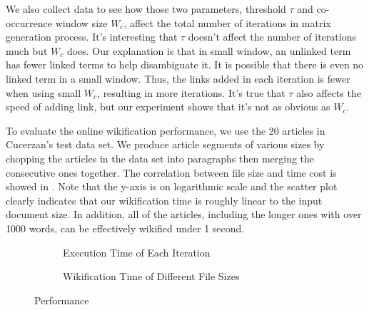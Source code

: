 We also collect data to see how those two parameters, threshold $\tau$ and co-occurrence
window size $W_c$, affect the total number of iterations in matrix generation process.
It's interesting that $\tau$ doesn't affect the number of iterations much but $W_c$ does.
Our explanation is that in small window, an unlinked term has fewer linked terms to
help disambiguate it. It is possible that there is even no linked term in a small window.
Thus, the links added in each iteration is fewer when using small $W_c$, resulting in
more iterations. It's true that $\tau$ also affects the speed of adding link, but our
experiment shows that it's not as obvious as $W_c$.


To evaluate the online wikification performance,
we use the 20 articles in Cucerzan's test data set.
We produce article segments of various sizes by chopping the articles in the
data set into paragraphs then merging the consecutive ones together.
The correlation between file size and time cost is showed in
. Note that the y-axis is on logarithmic scale and the
scatter plot clearly indicates that our wikification time is roughly linear
to the input document size. In addition, all of the articles, including the
longer ones with over 1000 words, can be effectively wikified under 1 second.

\begin{figure}[th]
\centering
\begin{subfigure}[t]{0.49\columnwidth}
\centering
{}
\caption{Execution Time of Each Iteration}
\label{fig:itime}
\end{subfigure}
\hfill
\begin{subfigure}[t]{0.49\columnwidth}
\centering
{}
\caption{Wikification Time of Different File Sizes}
\label{fig:etime}
\end{subfigure}
\caption{Performance}
\end{figure}


